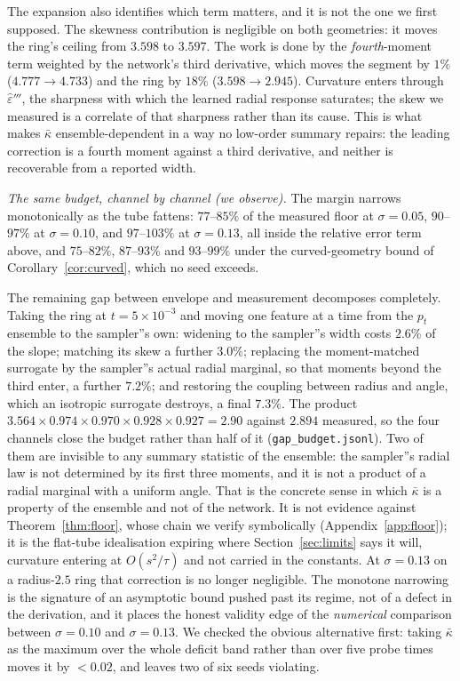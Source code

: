 \documentclass[11pt]{article}
\theoremstyle{remark}
\newcommand{\kb}{\bar\kappa}
\newcommand{\epshat}{\hat\varepsilon}
\begin{document}
The expansion also identifies which term matters, and it is not the one we first supposed.
The skewness contribution is negligible on both geometries: it moves the ring's ceiling from
$3.598$ to $3.597$. The work is done by the \emph{fourth}-moment term weighted by the
network's third derivative, which moves the segment by $1\%$ ($4.777\to4.733$) and the ring
by $18\%$ ($3.598\to2.945$). Curvature enters through $\epshat'''$, the sharpness with which
the learned radial response saturates; the skew we measured is a correlate of that sharpness
rather than its cause. This is what makes $\kb$ ensemble-dependent in a way no low-order
summary repairs: the leading correction is a fourth moment against a third derivative, and
neither is recoverable from a reported width.

\emph{The same budget, channel by channel (\emph{we observe}).} The margin narrows
monotonically as the tube fattens: $77$--$85\%$ of the measured floor at $\sigma=0.05$,
$90$--$97\%$ at $\sigma=0.10$, and $97$--$103\%$ at $\sigma=0.13$, all inside the
relative error term above, and $75$--$82\%$, $87$--$93\%$ and $93$--$99\%$ under the
curved-geometry bound of Corollary~\ref{cor:curved}, which no seed exceeds.

The remaining gap between envelope and measurement decomposes completely. Taking the ring
at $t=5\times10^{-3}$ and moving one feature at a time from the $p_t$ ensemble to the
sampler''s own: widening to the sampler''s width costs $2.6\%$ of the slope; matching its
skew a further $3.0\%$; replacing the moment-matched surrogate by the sampler''s actual
radial marginal, so that moments beyond the third enter, a further $7.2\%$; and restoring
the coupling between radius and angle, which an isotropic surrogate destroys, a final
$7.3\%$. The product $3.564\times0.974\times0.970\times0.928\times0.927=2.90$ against
$2.894$ measured, so the four channels close the budget rather than half of it
(\texttt{gap\_budget.jsonl}). Two of them are invisible to any summary statistic of the
ensemble: the sampler''s radial law is not determined by its first three moments, and it is
not a product of a radial marginal with a uniform angle. That is the concrete sense in
which $\kb$ is a property of the ensemble and not of the network. It is not evidence against Theorem~\ref{thm:floor}, whose chain we verify
symbolically (Appendix~\ref{app:floor}); it is the flat-tube idealisation expiring where
Section~\ref{sec:limits} says it will, curvature entering at $O(s^2/\tau)$ and not carried
in the constants. At $\sigma=0.13$ on a radius-$2.5$ ring that correction is no longer
negligible. The monotone narrowing is the signature of an asymptotic bound pushed past its
regime, not of a defect in the derivation, and it places the honest validity edge of the
\emph{numerical} comparison between $\sigma=0.10$ and $\sigma=0.13$. We checked the
obvious alternative first: taking $\kb$ as the maximum over the whole deficit band rather
than over five probe times moves it by ${<}0.02$, and leaves two of six seeds violating.
\end{document}
